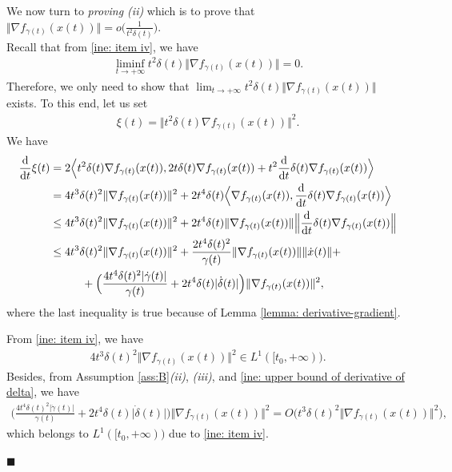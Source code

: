 \documentclass[11pt]{article}
\numberwithin{equation}{section}
\newenvironment{proof}{\bigskip\noindent{\bf Proof.}}{\hfill $\blacksquare$ \par\bigskip\noindent}
\begin{document}
\begin{proof}
We now turn to \emph{proving \textit{(ii)}} which is to prove that $\Big\Vert \nabla f_{\gamma(t)}(x(t)) \Big\Vert=o\Big(\frac{1}{t^2\delta(t)}\Big)$. \\
Recall that from \eqref{ine: item iv}, we have 
\begin{align*}
    \liminf_{t \rightarrow+\infty} t^2\delta(t)\Big\Vert \nabla f_{\gamma(t)}(x(t)) \Big\Vert=0.
\end{align*}
Therefore, we only need to show that $\lim_{t \rightarrow+\infty} t^2\delta(t)\Big\Vert \nabla f_{\gamma(t)}(x(t)) \Big\Vert$ exists. To this end, let us set
\begin{align*}
    \xi(t)=\Vert t^2\delta(t)\nabla f_{\gamma(t)}(x(t)) \Vert^2.
\end{align*}
We have 
\begin{align*}
    \frac{\mathrm{d}}{\mathrm{d}t}\xi(t)
    &=2\Big\langle t^2\delta(t)\nabla f_{\gamma(t)}(x(t)), 2t\delta(t)\nabla f_{\gamma(t)}(x(t))+t^2\frac{\mathrm{d}}{\mathrm{d}t}\delta(t)\nabla f_{\gamma(t)}(x(t)) \Big\rangle \\
    &=4t^3\delta(t)^2\Vert \nabla f_{\gamma(t)}(x(t)) \Vert^2+2t^4\delta(t)\Big\langle \nabla f_{\gamma(t)} (x(t)),\frac{\mathrm{d}}{\mathrm{d}t}\delta(t)\nabla f_{\gamma(t)}(x(t)) \Big\rangle\\
    &\le 4t^3\delta(t)^2\Vert \nabla f_{\gamma(t)}(x(t)) \Vert^2+2t^4\delta(t)\Vert \nabla f_{\gamma(t)} (x(t))\Vert \Big\Vert\frac{\mathrm{d}}{\mathrm{d}t}\delta(t)\nabla f_{\gamma(t)}(x(t)) \Big\Vert \\
    &\le  4t^3\delta(t)^2\Vert \nabla f_{\gamma(t)}(x(t)) \Vert^2+\frac{2t^4\delta(t)^2}{\gamma(t)}\Vert \nabla f_{\gamma(t)}(x(t)) \Vert \Vert \dot{x}(t) \Vert+\\&\hskip1cm +\Big(\frac{4t^4\delta(t)^2\vert \dot{\gamma}(t)\vert}{\gamma(t)}+2t^4\delta(t)\vert \dot{\delta}(t)\vert\Big)\Vert \nabla f_{\gamma(t)}(x(t)) \Vert^2,
\end{align*}
where the last inequality is true because of Lemma \ref{lemma: derivative-gradient}. 

From \eqref{ine: item iv}, we have 
\begin{align*}
4t^3\delta(t)^2\Vert \nabla f_{\gamma(t)}(x(t)) \Vert^2 \in L^1([t_0,+\infty)).   
\end{align*}
Besides, from Assumption \ref{ass:B}\textit{(ii)}, \textit{(iii)}, and \eqref{ine: upper bound of derivative of delta}, we have 
\begin{align*}
    \Big(\frac{4t^4\delta(t)^2\vert \dot{\gamma}(t)\vert}{\gamma(t)}+2t^4\delta(t)\vert \dot{\delta}(t)\vert\Big)\Vert \nabla f_{\gamma(t)}(x(t)) \Vert^2 = O\Big(t^3\delta(t)^2\Vert \nabla f_{\gamma(t)}(x(t)) \Vert^2\Big),
\end{align*}
which belongs to $L^1([t_0,+\infty))$ due to \eqref{ine: item iv}.


\end{proof}
\end{document}
